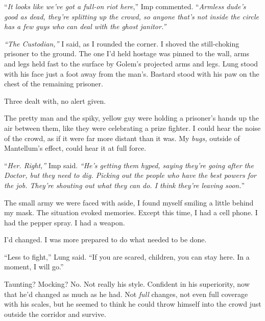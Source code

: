 ``\emph{It looks like we've got a full-on riot here},'' Imp commented.  ``\emph{Armless dude's good as dead, they're splitting up the crowd, so anyone that's not inside the circle has a few guys who can deal with the ghost janitor.''}



\emph{``The Custodian,'' }I said, as I rounded the corner.  I shoved the still-choking prisoner to the ground.  The one I'd held hostage was pinned to the wall, arms and legs held fast to the surface by Golem's projected arms and legs.  Lung stood with his face just a foot away from the man's.  Bastard stood with his paw on the chest of the remaining prisoner.



Three dealt with, no alert given.



The pretty man and the spiky, yellow guy were holding a prisoner's hands up the air between them, like they were celebrating a prize fighter.  I could hear the noise of the crowd, as if it were far more distant than it was.  My \emph{bugs, }outside of Mantellum's effect, could hear it at full force.



``\emph{Her.  Right,'' }Imp said. \emph{ ``He's getting them hyped, saying they're going after the Doctor, but they need to dig.  Picking out the people who have the best powers for the job.  They're shouting out what they can do.  I think they're leaving soon.}''



The small army we were faced with aside, I found myself smiling a little behind my mask.  The situation evoked memories.  Except this time, I had a cell phone.  I had the pepper spray.  I had a weapon.



I'd changed.  I was more prepared to do what needed to be done.



``Less to fight,'' Lung said.  ``If you are scared, children, you can stay here.  In a moment, I will go.''



Taunting?  Mocking?  No.  Not really his style.  Confident in his superiority, now that he'd changed as much as he had.  Not \emph{full} changes, not even full coverage with his scales, but he seemed to think he could throw himself into the crowd just outside the corridor and survive.



